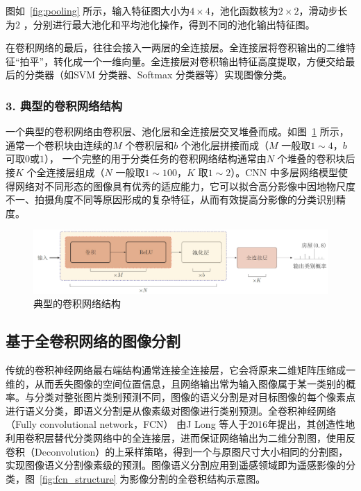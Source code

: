 图如~\ref{fig:pooling} 所示，输入特征图大小为$4 \times 4$，池化函数核为$2 \times 2$，滑动步长为$2$ ，分别进行最大池化和平均池化操作，得到不同的池化输出特征图。

在卷积网络的最后，往往会接入一两层的全连接层。全连接层将卷积输出的二维特征“拍平”，转化成一个一维向量。全连接层对卷积输出特征高度提取，方便交给最后的分类器（如SVM 分类器、Softmax 分类器等）实现图像分类。

\subsubsection*{3. 典型的卷积网络结构}
\label{subsec:chap02-2-1-3}

一个典型的卷积网络由卷积层、池化层和全连接层交叉堆叠而成。如图~\ref{fig:cnn_structure} 所示，通常一个卷积块由连续的$M$ 个卷积层和$b$ 个池化层拼接而成（$M$ 一般取$1\sim 4$，$b$ 可取$0$或$1$）， 一个完整的用于分类任务的卷积网络结构通常由$N$ 个堆叠的卷积块后接$K$ 个全连接层组成（$N$ 一般取$1\sim 100$，$K$ 取$1 \sim 2$）。CNN 中多层网络模型使得网络对不同形态的图像具有优秀的适应能力，它可以拟合高分影像中因地物尺度不一、拍摄角度不同等原因形成的复杂特征，从而有效提高分影像的分类识别精度。

\begin{figure}[htb]
  \centering
  \includegraphics[width=1.0\textwidth]{figures/cnn_structure}
  \caption{典型的卷积网络结构}\label{fig:cnn_structure}
\end{figure}

\subsection{基于全卷积网络的图像分割}
\label{subsec:chap02-2-1}
传统的卷积神经网络最右端结构通常连接全连接层，它会将原来二维矩阵压缩成一维的，从而丢失图像的空间位置信息，且网络输出常为输入图像属于某一类别的概率。与分类对整张图片类别预测不同，图像的语义分割是对目标图像的每个像素点进行语义分类，即语义分割是从像素级对图像进行类别预测。全卷积神经网络（Fully convolutional network，FCN）\cite{long2015fully} 由J Long 等人于2016年提出，其创造性地利用卷积层替代分类网络中的全连接层，进而保证网络输出为二维分割图，使用反卷积（Deconvolution）的上采样策略，得到一个与原图尺寸大小相同的分割图，实现图像语义分割像素级的预测。图像语义分割应用到遥感领域即为遥感影像的分类，图~\ref{fig:fcn_structure} 为影像分割的全卷积结构示意图。

